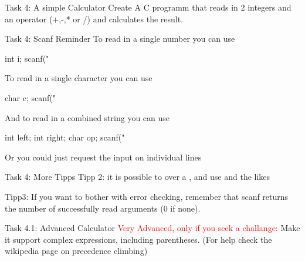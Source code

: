 \documentclass[10pt,graphics,aspectratio=169,table]{beamer}
\begin{document}
\begin{frame}[fragile]{Task 4: A simple Calculator}
Create A C programm that reads in 2 integers and an operator (+,-,* or /)
and calculates the result. 

\end{frame}

\begin{frame}[fragile]{Task 4: Scanf Reminder}
To read in a single number you can use 
\begin{codeblock}
int i;
scanf("%
\end{codeblock}

To read in a single character you can use
\begin{codeblock}
    char c;
    scanf("%
\end{codeblock}

And to read in a combined string you can use
\begin{codeblock}
    int left;
    int right;
    char op;
    scanf("%
\end{codeblock}

Or you could just request the input on individual lines
\end{frame}

\begin{frame}[fragile]{Task 4: More Tipps}
Tipp 2:
it is possible to  over a ,
and use  and the likes 

Tipp3: If you want to bother with error checking, remember that scanf returns
the number of successfully read arguments (0 if none).
\end{frame}


\begin{frame}[fragile]{Task 4.1: Advanced Calculator}
\textcolor{red}{Very Advanced, only if you seek a challange:} 
Make it support complex expressions, including parentheses.
(For help check the wikipedia page on precedence climbing)
\end{frame}
\end{document}
